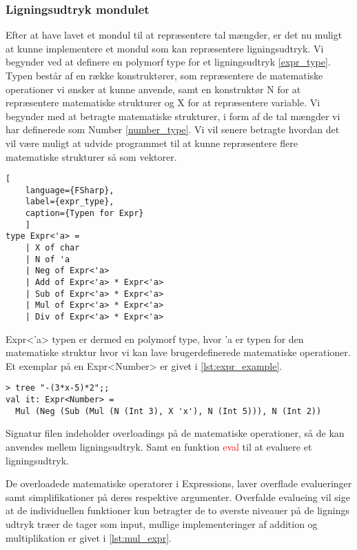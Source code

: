 \documentclass{article}
\begin{document}
\subsubsection{Ligningsudtryk mondulet} \label{sec:expression_module}
Efter at have lavet et mondul til at repræsentere tal mængder, er det nu muligt at kunne implementere et mondul som kan repræsentere ligningsudtryk. Vi begynder ved at definere en polymorf type for et ligningsudtryk \ref{expr_type}. Typen består af en række konstruktører, som repræsentere de matematiske operationer vi ønsker at kunne anvende, samt en konstruktør N for at repræsentere matematiske strukturer og X for at repræsentere variable. Vi begynder med at betragte matematiske strukturer, i form af de tal mængder vi har definerede som Number \ref{number_type}. Vi vil senere betragte hvordan det vil være muligt at udvide programmet til at kunne repræsentere flere matematiske strukturer så som vektorer.     

\begin{lstlisting}[
    language={FSharp}, 
    label={expr_type}, 
    caption={Typen for Expr}
    ]
type Expr<'a> = 
    | X of char
    | N of 'a
    | Neg of Expr<'a>
    | Add of Expr<'a> * Expr<'a>
    | Sub of Expr<'a> * Expr<'a>
    | Mul of Expr<'a> * Expr<'a>
    | Div of Expr<'a> * Expr<'a>
\end{lstlisting}

Expr\textless'a\textgreater{}  typen er dermed en polymorf type, hvor 'a er typen for den matematiske struktur hvor vi kan lave brugerdefinerede matematiske operationer. Et exemplar på en Expr\textless Number\textgreater{}  er givet i \ref{lst:expr_example}. 

\begin{lstlisting}[style=output, label={lst:expr_example}, caption={$-(3 \cdot x - 5) \cdot 2$ som et udtryks træ. Funktionen tree bliver beskrevet i \ref{sec:expression_generation}.}]
> tree "-(3*x-5)*2";;
val it: Expr<Number> = 
  Mul (Neg (Sub (Mul (N (Int 3), X 'x'), N (Int 5))), N (Int 2))
\end{lstlisting}

Signatur filen indeholder overloadings på de matematiske operationer, så de kan anvendes mellem ligningsudtryk. Samt en funktion \textcolor{red}{eval} til at evaluere et ligningsudtryk. 




De overloadede matematiske operatorer i Expressions, laver overflade evalueringer samt simplifikationer på deres respektive argumenter. Overfalde evalueing vil sige at de individuellen funktioner kun betragter de to øverste niveauer på de lignings udtryk træer de tager som input, mullige implementeringer af addition og multiplikation er givet i \ref{lst:mul_expr}. 
\end{document}
